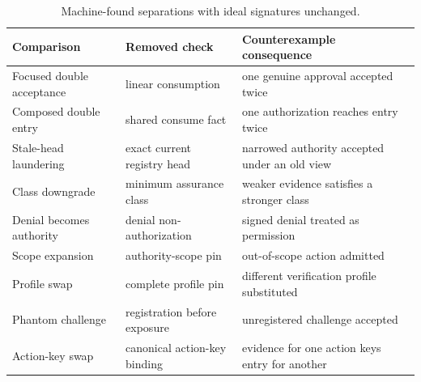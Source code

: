 \documentclass[10pt]{article}
\begin{document}
\begin{table}[ht]
\centering
\caption{Machine-found separations with ideal signatures unchanged.}
\label{tab:machine-separations}
\small
\begin{tabularx}{\textwidth}{@{}>{\raggedright\arraybackslash}p{}>{\raggedright\arraybackslash}p{}>{\raggedright\arraybackslash}X@{}}
\toprule
Comparison & Removed check & Counterexample consequence \\
\midrule
Focused double acceptance & linear consumption & one genuine approval accepted twice \\
Composed double entry & shared consume fact & one authorization reaches entry twice \\
Stale-head laundering & exact current registry head & narrowed authority accepted under an old view \\
Class downgrade & minimum assurance class & weaker evidence satisfies a stronger class \\
Denial becomes authority & denial non-authorization & signed denial treated as permission \\
Scope expansion & authority-scope pin & out-of-scope action admitted \\
Profile swap & complete profile pin & different verification profile substituted \\
Phantom challenge & registration before exposure & unregistered challenge accepted \\
Action-key swap & canonical action-key binding & evidence for one action keys entry for another \\
\bottomrule
\end{tabularx}
\normalsize
\end{table}
\end{document}
